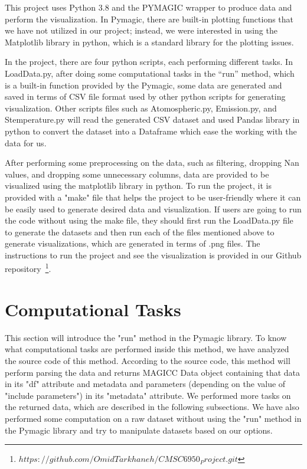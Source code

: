 \documentclass[12pt]{article}
\begin{document}
This project uses Python 3.8 and the PYMAGIC wrapper to produce data and perform the visualization. In Pymagic, there are built-in plotting functions that we have not utilized in our project; instead, we were interested in using the Matplotlib library in python, which is a standard library for the plotting issues.

In the project, there are four python scripts, each performing different tasks. In LoadData.py, after doing some computational tasks in the “run” method, which is a built-in function provided by the Pymagic, some data are generated and saved in terms of CSV file format used by other python scripts for generating visualization. Other scripts files such as Atomospheric.py, Emission.py, and Stemperature.py will read the generated CSV dataset and used Pandas library in python to convert the dataset into a Dataframe which ease the working with the data for us.

After performing some preprocessing on the data, such as filtering, dropping Nan values, and dropping some unnecessary columns, data are provided to be visualized using the matplotlib library in python. To run the project, it is provided with a "make" file that helps the project to be user-friendly where it can be easily used to generate desired data and visualization. If users are going to run the code without using the make file, they should first run the LoadData.py file to generate the datasets and then run each of the files mentioned above to generate visualizations, which are generated in terms of .png files.
The instructions to run the project and see the visualization is provided in our Github repository~\footnote{$https://github.com/OmidTarkhaneh/CMSC6950_Project.git$}.

\section{Computational Tasks}
This section will introduce the "run" method in the Pymagic library. To know what computational tasks are performed inside this method, we have analyzed the source code of this method. According to the source code, this method will perform parsing the data and returns MAGICC Data object containing that data in its "df" attribute and metadata and parameters (depending on the value of "include parameters") in its "metadata" attribute. We performed more tasks on the returned data, which are described in the following subsections. We have also performed some computation on a raw dataset without using the "run" method in the Pymagic library and try to manipulate datasets based on our options.
\end{document}
